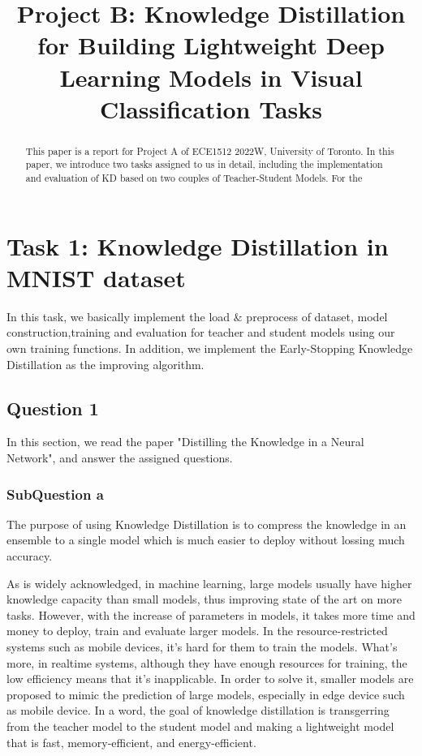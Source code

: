 \documentclass[conference]{IEEEtran}
\begin{document}
\title{Project B: Knowledge Distillation for Building Lightweight Deep Learning Models in Visual Classification Tasks
}
\maketitle

\begin{abstract}
This paper is a report for Project A of ECE1512 2022W, University of Toronto.
In this paper, we introduce two tasks assigned to us in detail, including the implementation and evaluation of KD based on two couples of Teacher-Student Models.
For the 
\end{abstract}

\section{Task 1: Knowledge Distillation in MNIST dataset}
In this task, we basically implement the load \& preprocess of dataset, model construction,training and evaluation for teacher and student models using our own training functions.
In addition, we implement the Early-Stopping Knowledge Distillation as the improving algorithm.
\subsection{Question 1}
In this section, we read the paper "Distilling the Knowledge in a Neural Network"\cite{b6}, and answer the assigned questions.
\subsubsection{SubQuestion a}
The purpose of using Knowledge Distillation is to compress the knowledge in an ensemble to a single model which is much easier to deploy without lossing much accuracy.\par
As is widely acknowledged, in machine learning, large models usually have higher knowledge capacity than small models, thus improving state of the art on more tasks. 
However, with the increase of parameters in models, it takes more time and money to deploy, train and evaluate larger models.
In the resource-restricted systems such as mobile devices, it's hard for them to train the models. What's more, in realtime systems, although they have enough resources for training, the low efficiency means that it's inapplicable.
In order to solve it, smaller models are proposed to mimic the prediction of large models, especially in edge device such as mobile device. In a word, the goal of knowledge distillation is transgerring from the teacher model to the student model and making a lightweight model that is fast, memory-efficient, and energy-efficient.
\end{document}
